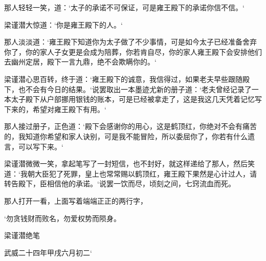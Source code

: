 那人轻轻一笑，道：‘太子的承诺不可保证，可是雍王殿下的承诺你信不信。‘

梁谨潜大惊道：‘你是雍王殿下的人。‘

那人淡淡道：‘雍王殿下知道你为太子做了不少事情，可是如今太子已经准备舍弃你了，你的家人子女更是会成为陪葬，你若肯自尽，你的家人雍王殿下会安排他们去幽州定居，殿下一言九鼎，绝不会欺瞒你的。‘

梁谨潜心思百转，终于道：‘雍王殿下的诚意，我信得过，如果老夫早些跟随殿下，也不会有今日的结果。‘说罢取出一本墨迹尤新的册子道：‘老夫曾经记录了一本太子殿下从户部挪用银钱的账本，可是已经被拿走了，这是我这几天凭着记忆写下来的，希望对雍王殿下有用。‘

那人接过册子，正色道：‘殿下会感谢你的用心，这是鹤顶红，你绝对不会有痛苦的，我知道你希望和家人诀别，可是我不能冒险，所以委屈你了，你若有什么遗言，可以写下来。‘

梁谨潜微微一笑，拿起笔写了一封短信，也不封好，就这样递给了那人，然后笑道：‘我朝大臣犯了死罪，皇上也常常赐以鹤顶红，雍王殿下果然是心计过人，请转告殿下，臣相信他的承诺。‘说罢一饮而尽，顷刻之间，七窍流血而死。

那人打开一看，上面写着端端正正的两行字，

‘勿贪钱财而败名，勿爱权势而陨身。

梁谨潜绝笔

武威二十四年甲戌六月初二‘

